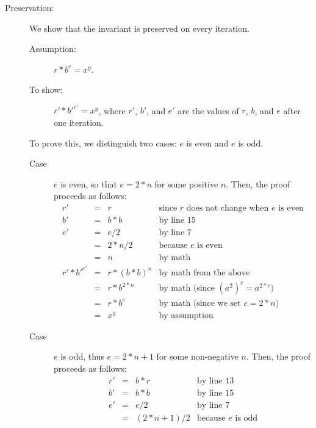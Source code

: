 \begin{description}
\item[Preservation:] We show that the invariant is preserved on every
  iteration.
  \begin{description}
  \item[Assumption:] $r * b^e = x^y$.
  \item[To show:] $r' * {b'}^{e'} = x^y$, where $r'$,
    $b'$, and $e'$ are the values of $r$, $b$, and $e$ after one
    iteration.
  \end{description}
  To prove this, we distinguish two cases: $e$ is even and $e$
  is odd.
  \begin{description}
  \item[Case] $e$ is even, so that $e=2*n$ for some positive $n$.
    Then, the proof proceeds as follows:
    $$
    \begin{array}{rcll}
          r'
      &=& r                & \text{since $r$ does not change when $e$ is even}
    \\[1ex]
          b'
      &=& b*b              & \text{by line 15}
    \\[1ex]
          e'
      &=& e/2              & \text{by line 7}
    \\&=& 2*n/2            & \text{because $e$ is even}
    \\&=& n                & \text{by math}
    \\[1ex]
            r' * {b'}^{e'}
      &=& r * {(b*b)}^n    & \text{by math from the above}
    \\&=& r * b^{2*n}      & \text{by math (since $(a^2)^c = a^{2*c}$)}
    \\&=& r * b^e          & \text{by math (since we set $e=2*n$)}
    \\&=& x^y              & \text{by assumption}
    \end{array}
    $$
  \item[Case] $e$ is odd, thus $e = 2*n + 1$ for some non-negative $n$.
    Then, the proof proceeds as follows:
    $$
    \begin{array}{rcll}
          r'
      &=& b*r                 & \text{by line 13}
    \\[1ex]
          b'
      &=& b*b                 & \text{by line 15}
    \\[1ex]
          e'
      &=& e/2                 & \text{by line 7}
    \\&=& (2*n+1)/2           & \text{because $e$ is odd}

\end{array}$$
\end{description}
\end{description}
